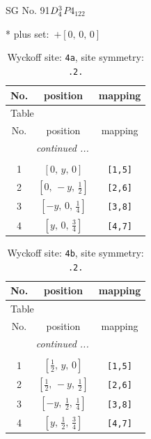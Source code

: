 \documentclass[fleqn,8pt]{jsarticle}
\begin{document}
\setcounter{MaxMatrixCols}{32}

\renewcommand{\tablename}{Table~}
\renewcommand{\figurename}{Figure~}
\begin{center}
\LARGE
SG No. 91\quad$D_{\rm 4}^{3}$\quad$P4_122$\quad[ tetragonal ]
\end{center}
* plus set:\,\,\,$+\left[ 0,\, 0,\, 0 \right]$
\renewcommand{\arraystretch}{1.2}
\begin{longtable}{ccc}
\caption{Wyckoff site: {\tt 4a}, site symmetry: {\tt .2.}}
 \\
 \hline \hline
No. & position & mapping \\ \hline \endfirsthead

\multicolumn{2}{l}{\tablename\ \thetable{}} \\
 \hline \hline
No. & position & mapping \\ \hline \endhead

 \hline \hline
\multicolumn{2}{r}{\footnotesize\it continued ...} \\ \endfoot

 \hline \hline
\multicolumn{2}{r}{} \\ \endlastfoot

1 & $\left[ 0,\, y,\, 0 \right]$ & {\tt [1,5]} \\ \hline
2 & $\left[ 0,\, - y,\, \frac{1}{2} \right]$ & {\tt [2,6]} \\ \hline
3 & $\left[ - y,\, 0,\, \frac{1}{4} \right]$ & {\tt [3,8]} \\ \hline
4 & $\left[ y,\, 0,\, \frac{3}{4} \right]$ & {\tt [4,7]} \\
\end{longtable}
\renewcommand{\arraystretch}{1.2}
\begin{longtable}{ccc}
\caption{Wyckoff site: {\tt 4b}, site symmetry: {\tt .2.}}
 \\
 \hline \hline
No. & position & mapping \\ \hline \endfirsthead

\multicolumn{2}{l}{\tablename\ \thetable{}} \\
 \hline \hline
No. & position & mapping \\ \hline \endhead

 \hline \hline
\multicolumn{2}{r}{\footnotesize\it continued ...} \\ \endfoot

 \hline \hline
\multicolumn{2}{r}{} \\ \endlastfoot

1 & $\left[ \frac{1}{2},\, y,\, 0 \right]$ & {\tt [1,5]} \\ \hline
2 & $\left[ \frac{1}{2},\, - y,\, \frac{1}{2} \right]$ & {\tt [2,6]} \\ \hline
3 & $\left[ - y,\, \frac{1}{2},\, \frac{1}{4} \right]$ & {\tt [3,8]} \\ \hline
4 & $\left[ y,\, \frac{1}{2},\, \frac{3}{4} \right]$ & {\tt [4,7]} \\
\end{longtable}
\end{document}
